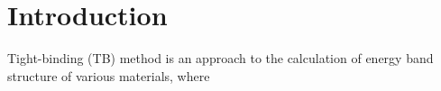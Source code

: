 \chapter{Introduction}
\label{ch:introduction}
Tight-binding (TB) method is an approach to the calculation of energy band structure of various materials, where 